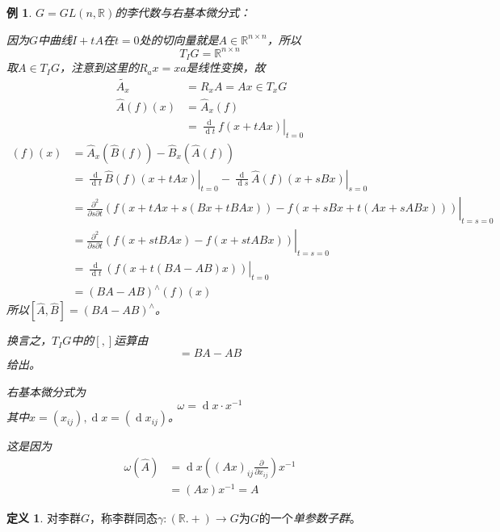 \documentclass[winfonts,UTF8,c5size,a4paper,fancyhdr,hyperref,titlepage,nocap]{ctexart}
\newtheorem{exa}[thm]{例}
\theoremstyle{definition}
\newtheorem{defn}[thm]{定义}
\theoremstyle{remark}
\numberwithin{equation}{subsection}
\newcommand{\Real}{\mathbb{R}}
\newcommand{\red}{\color{red}}
\newcommand{\dd}{\operatorname{d}}
\newcommand{\dt}{\frac{\operatorname{d}}{\operatorname{d}t}}
\newcommand{\pfrac}[2]{\frac{\partial{#1}}{\partial{#2}}}
\newcommand{\local}[2]{\left.{#1}\right|_{#2}}%
\newcommand{\localt}[1]{\local{#1}{t=0}}%
\begin{document}
\begin{exa}
$G=GL(n,\Real)$的李代数与右基本微分式：

因为$G$中曲线$I+tA$在$t=0$处的切向量就是$A\in\Real^{n\times n}$，所以
\begin{equation*}
T_IG=\Real^{n\times n}
\end{equation*}
取$A\in T_IG$，注意到这里的$R_ax=xa$是线性变换，故
\begin{align*}
\widetilde{A_x}&=R_xA=Ax\in T_xG\\
\widehat{A}(f)(x)&=\widehat{A}_x(f)\\
                 &=\localt{\dt f(x+tAx)}
\end{align*}
\begin{align*}
[\widehat{A},\widehat{B}](f)(x)&=\widehat{A}_x(\widehat{B}(f))-\widehat{B}_x(\widehat{A}(f))\\
                               &=\localt{\dt\widehat{B}(f)(x+tAx)}-\local{\frac{\dd}{\dd s}\widehat{A}(f)(x+sBx)}{s=0}\\
                               &=\local{\frac{\partial^2}{\partial s\partial t}(f(x+tAx+s(Bx+tBAx))-f(x+sBx+t(Ax+sABx)))}{t=s=0}\\
                               &=\local{\frac{\partial^2}{\partial s\partial t}(f(x+stBAx)-f(x+stABx))}{t=s=0}\\
                               &=\localt{\dt(f(x+t(BA-AB)x))}\\
                               &=(BA-AB)^{\wedge}(f)(x)
\end{align*}
所以$[\widehat{A},\widehat{B}]=(BA-AB)^{\wedge}$。

换言之，$T_IG$中的$[,]$运算由
\begin{equation*}
[A,B]=BA-AB
\end{equation*}
给出。

右基本微分式为
\begin{equation*}
\omega=\dd x\cdot x^{-1}
\end{equation*}
其中$x=(x_{ij}), \dd x=(\dd x_{ij})$。

这是因为
\begin{align*}
 \omega(\widehat{A})&=\dd x((Ax)_{ij}\pfrac{}{x_{ij}})x^{-1}\\
                   &=(Ax)x^{-1}=A
\end{align*}
\end{exa}

\begin{defn}
  对李群$G$，称李群同态$\gamma\colon(\Real.+)\to G$为$G$的一个\emph{\red 单参数子群}。
\end{defn}
\end{document}
